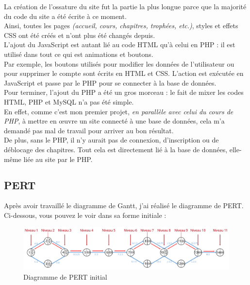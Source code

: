La création de l'ossature du site fut la partie la plus longue parce que la majorité du code du site a été écrite à ce moment. \\
Ainsi, toutes les pages \textit{(accueil, cours, chapitres, trophées, etc.)}, styles et effets CSS ont été créés et n'ont plus été changés depuis. \\

L'ajout du JavaScript est autant lié au code HTML qu'à celui en PHP : il est utilisé dans tout ce qui est animations et boutons. \\
Par exemple, les boutons utilisés pour modifier les données de l'utilisateur ou pour supprimer le compte sont écrits en HTML et CSS. L'action est exécutée en JavaScript et passe par le PHP pour se connecter à la base de données. \\

Pour terminer, l'ajout du PHP a été un gros morceau : le fait de mixer les codes HTML, PHP et MySQL n'a pas été simple. \\
En effet, comme c'est mon premier projet, \textit{en parallèle avec celui du cours de PHP}, à mettre en œuvre un site connecté à une base de données, cela m'a demandé pas mal de travail pour arriver au bon résultat. \\
De plus, sans le PHP, il n'y aurait pas de connexion, d'inscription ou de déblocage des chapitres. Tout cela est directement lié à la base de données, elle-même liée au site par le PHP.

\newpage


\subsection{PERT}
\label{subsec:pert}

Après avoir travaillé le diagramme de Gantt, j'ai réalisé le diagramme de PERT.
Ci-dessous, vous pouvez le voir dans sa forme initiale :

\begin{figure}[h]
  \centering
  \includegraphics[scale=0.49]
  {textures/images/diagrammes/DiagrammeDePert1.pdf}
  \caption{Diagramme de PERT initial}
  \label{fig:pert-initial}
\end{figure}

